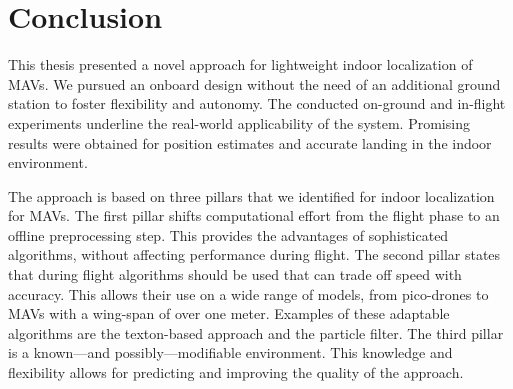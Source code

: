 \chapter{Conclusion}
\label{chap:conclusion}

This thesis presented a novel approach for lightweight indoor
localization of MAVs. We pursued an onboard design without the need of
an additional ground station to foster flexibility and autonomy. The
conducted on-ground and in-flight experiments underline the real-world
applicability of the system. Promising results were obtained for
position estimates and accurate landing in the indoor environment.

The approach is based on three pillars that we identified for indoor
localization for MAVs. The first pillar shifts computational effort
from the flight phase to an offline preprocessing step. This provides
the advantages of sophisticated algorithms, without affecting
performance during flight. The second pillar states that during flight
algorithms should be used that can trade off speed with accuracy. This
allows their use on a wide range of models, from pico-drones to MAVs
with a wing-span of over one meter. Examples of these adaptable
algorithms are the texton-based approach and the particle filter. The
third pillar is a known---and possibly---modifiable environment. This
knowledge and flexibility allows for predicting and improving the
quality of the approach.

